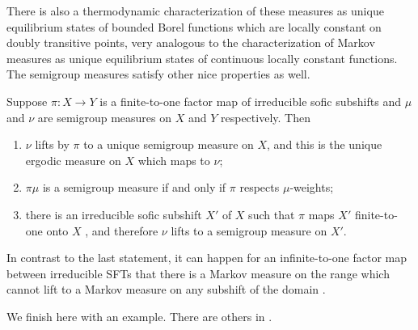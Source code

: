 \documentclass{kepart2010}
\theoremstyle{plain}
\theoremstyle{definition}
\theoremstyle{remark}
\theoremstyle{definition}
\numberwithin{equation}{section}
\begin{document}
There is also a thermodynamic characterization of these measures as
unique equilibrium states of  bounded Borel functions which are
locally constant on doubly transitive points, very analogous to the
characterization of Markov measures as unique equilibrium states of
continuous locally constant functions.
 The semigroup measures satisfy other nice properties as well.

\begin{thm}\cite{KitchensTuncel1985}
Suppose $\pi:X\to Y$ is a finite-to-one factor map of irreducible
sofic subshifts and $\mu$ and  $\nu$ are semigroup measures on $X$
and $Y$ respectively. Then
\begin{enumerate}
\item
$\nu$ lifts by $\pi$ to a unique semigroup measure on $X$, and this
is the unique ergodic measure on $X$  which maps to $\nu$;
\item
$\pi\mu$ is a semigroup measure if and only if $\pi$ respects
$\mu$-weights;
\item
there is an irreducible sofic subshift $X'$ of $X$ such that $\pi$
maps $X'$ finite-to-one onto $X$ \cite{MarcusPetersenWilliams1984},
and therefore $\nu$ lifts to a semigroup measure  on $X'$.
\end{enumerate}
\end{thm}
In contrast to the last statement, it can happen for {an
infinite-to-one} factor map between irreducible SFTs that there is a
Markov measure on the range which cannot lift to a Markov measure on
any subshift of the domain \cite{MarcusPetersenWilliams1984}.

We finish here with
an example. There are others in
\cite{KitchensTuncel1985}.
\end{document}

